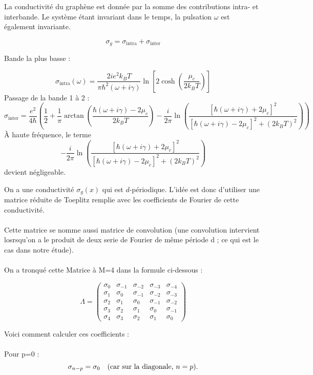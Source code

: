\documentclass{article}
\begin{document}
La conductivité du graphène est donnée par la somme des contributions intra- et interbande. Le système étant invariant dans le temps, la pulsation \( \omega \) est également invariante.

\[
\sigma_g = \sigma_{\text{intra}} + \sigma_{\text{inter}}
\]

Bande la plus basse :

\[
\sigma_{\text{intra}}(\omega) = \frac{2i e^2 k_B T}{\pi \hbar^2 (\omega + i \gamma)} \ln \left[ 2 \cosh\left(\frac{\mu_c}{2k_B T}\right) \right]
\]
Passage de la bande 1 à 2 :
\[
\sigma_{\text{inter}} = \frac{e^2}{4\hbar} \left( \frac{1}{2} + \frac{1}{\pi} \arctan \left( \frac{\hbar(\omega + i\gamma) - 2\mu_c}{2k_B T} \right)
- \frac{i}{2\pi} \ln \left( \frac{[\hbar(\omega + i\gamma) + 2\mu_c]^2}{[\hbar(\omega + i\gamma) - 2\mu_c]^2 + (2k_B T)^2} \right) \right)
\]
À haute fréquence, le terme
\[
- \frac{i}{2\pi} \ln \left( \frac{[\hbar(\omega + i\gamma) + 2\mu_c]^2}{[\hbar(\omega + i\gamma) - 2\mu_c]^2 + (2k_B T)^2} \right)
\]
devient négligeable.

\bigskip

On a une conductivité \( \sigma_g(x) \) qui est \( d \)-périodique.  
L'idée est donc d'utiliser une matrice réduite de Toeplitz remplie avec les coefficients de Fourier de cette conductivité. 
\\ \\
Cette matrice se nomme aussi matrice de convolution (une convolution intervient losrsqu'on a le produit de deux serie de Fourier de même période d ; ce qui est le cas dans notre étude).
\\ \\
On a tronqué cette Matrice à M=4 dans la formule ci-dessous :

\[
\Lambda = 
\begin{pmatrix}
\sigma_0 & \sigma_{-1} & \sigma_{-2} & \sigma_{-3} & \sigma_{-4} \\
\sigma_1 & \sigma_0     & \sigma_{-1} & \sigma_{-2} & \sigma_{-3} \\
\sigma_2 & \sigma_1     & \sigma_0     & \sigma_{-1} & \sigma_{-2} \\
\sigma_3 & \sigma_2     & \sigma_1     & \sigma_0     & \sigma_{-1} \\
\sigma_4 & \sigma_3     & \sigma_2     & \sigma_1     & \sigma_0
\end{pmatrix}
\]


Voici comment calculer ces coefficients : \\ \\
Pour p=0 :
\[
\sigma_{n-p} = \sigma_0 \quad \text{(car sur la diagonale, \( n = p \)).}
\]
\end{document}
